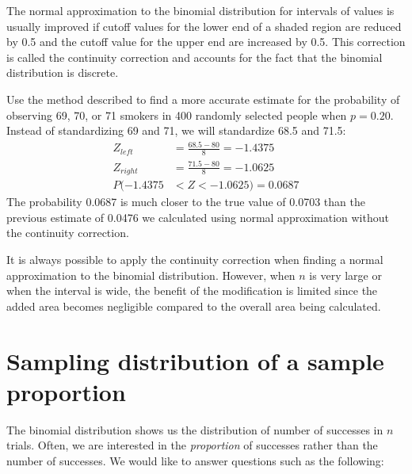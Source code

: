 \begin{tipBox}{
The normal approximation to the binomial distribution for intervals of values is usually improved if cutoff values for the lower end of a shaded region are reduced by 0.5 and the cutoff value for the upper end are increased by 0.5. This correction is called the continuity correction and accounts for the fact that the binomial distribution is discrete.}
\end{tipBox}

\begin{example}{Use the method described to find a more accurate estimate for the probability of observing 69, 70, or 71 smokers in 400 randomly selected people when $p=0.20$.}
Instead of standardizing 69 and 71, we will standardize 68.5 and 71.5:
\begin{align*}
Z_{left} &= \frac{68.5-80}{8} = -1.4375 \\
Z_{right} &= \frac{71.5-80}{8} = -1.0625 \\
P(-1.4375 &< Z < -1.0625) = 0.0687
\end{align*}
The probability 0.0687 is much closer to the true value of 0.0703 than the previous estimate of 0.0476 we calculated using normal approximation without the continuity correction.
\end{example}

It is always possible to apply the continuity correction when finding a normal approximation to the binomial distribution. However, when $n$ is very large or when the interval is wide, the benefit of the modification is limited since the added area becomes negligible compared to the overall area being calculated.




\section{Sampling distribution of a sample proportion}
\label{distributionphat}

The binomial distribution shows us the distribution of number of successes in $n$ trials. Often, we are interested in the \emph{proportion} of successes rather than the number of successes. We would like to answer questions such as the following:


